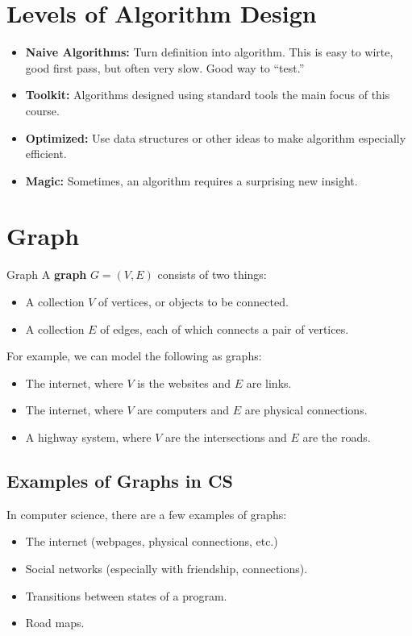 \documentclass[letterpaper]{article}
\begin{document}
\section{Levels of Algorithm Design}
\begin{itemize}
    \item \textbf{Naive Algorithms:} Turn definition into algorithm. This is easy to wirte, good first pass, but often very slow. Good way to ``test.''
    \item \textbf{Toolkit:} Algorithms designed using standard tools the main focus of this course. 
    \item \textbf{Optimized:} Use data structures or other ideas to make algorithm especially efficient. 
    \item \textbf{Magic:} Sometimes, an algorithm requires a surprising new insight. 
\end{itemize}

\section{Graph}
\begin{definition}{Graph}{}
    A \textbf{graph} $G = (V, E)$ consists of two things:
    \begin{itemize}
        \item A collection $V$ of vertices, or objects to be connected.
        \item A collection $E$ of edges, each of which connects a pair of vertices.
    \end{itemize}
\end{definition}

For example, we can model the following as graphs: 
\begin{itemize}
    \item The internet, where $V$ is the websites and $E$ are links. 
    \item The internet, where $V$ are computers and $E$ are physical connections. 
    \item A highway system, where $V$ are the intersections and $E$ are the roads. 
\end{itemize}

\subsection{Examples of Graphs in CS}
In computer science, there are a few examples of graphs: 
\begin{itemize}
    \item The internet (webpages, physical connections, etc.)
    \item Social networks (especially with friendship, connections).
    \item Transitions between states of a program. 
    \item Road maps. 
\end{itemize}
\end{document}
